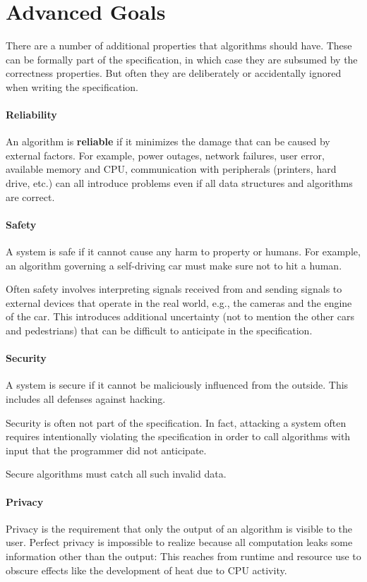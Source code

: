 \section{Advanced Goals}

There are a number of additional properties that algorithms should have.
These can be formally part of the specification, in which case they are subsumed by the correctness properties.
But often they are deliberately or accidentally ignored when writing the specification.

\paragraph{Reliability}
An algorithm is \textbf{reliable} if it minimizes the damage that can be caused by external factors.
For example, power outages, network failures, user error, available memory and CPU, communication with peripherals (printers, hard drive, etc.) can all introduce problems even if all data structures and algorithms are correct.

\paragraph{Safety}
A system is safe if it cannot cause any harm to property or humans.
For example, an algorithm governing a self-driving car must make sure not to hit a human.

Often safety involves interpreting signals received from and sending signals to external devices that operate in the real world, e.g., the cameras and the engine of the car.
This introduces additional uncertainty (not to mention the other cars and pedestrians) that can be difficult to anticipate in the specification.

\paragraph{Security}
A system is secure if it cannot be maliciously influenced from the outside.
This includes all defenses against hacking.

Security is often not part of the specification.
In fact, attacking a system often requires intentionally violating the specification in order to call algorithms with input that the programmer did not anticipate.

Secure algorithms must catch all such invalid data.

\paragraph{Privacy}
Privacy is the requirement that only the output of an algorithm is visible to the user.
Perfect privacy is impossible to realize because all computation leaks some information other than the output: This reaches from runtime and resource use to obscure effects like the development of heat due to CPU activity.

